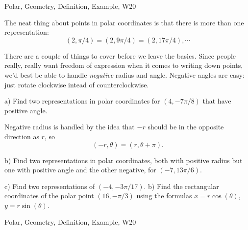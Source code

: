 \begin{tagblock}{Polar, Geometry, Definition, Example, W20}
\begin{question}

The neat thing about points in polar coordinates is that there is more than one representation:
\[
(2,\pi/4)=(2,9\pi/4)=(2,17\pi/4),\cdots
\]

There are a couple of things to cover before we leave the basics. Since people really, really want freedom of expression when it comes to writing down points, we'd best be able to handle \textit{negative} radius and angle. Negative angles are easy: just rotate clockwise intead of counterclockwise.

\bigskip

a) Find two representations in polar coordinates for $(4,-7\pi/8)$ that have positive angle. 

\bigskip

Negative radius is handled by the idea that $-r$ should be in the opposite direction as $r$, so 
\[
(-r,\theta)=(r,\theta+\pi).
\]

b) Find two representations in polar coordinates, both with positive radius but one with positive angle and the other negative, for $(-7,13\pi/6)$. 

\bigskip

c) Find two representations of $(-4,-3\pi/17)$. b) Find the rectangular coordinates of the polar point $(16,-\pi/3)$ using the formulas $x=r\cos(\theta)$, $y=r\sin(\theta)$. 
	
	
\begin{tags}
	    Polar, Geometry, Definition, Example, W20
\end{tags}
	
\begin{diary}
\end{diary}
	
\begin{solution}
	   
\end{solution}
	
\end{question}

\end{tagblock}


